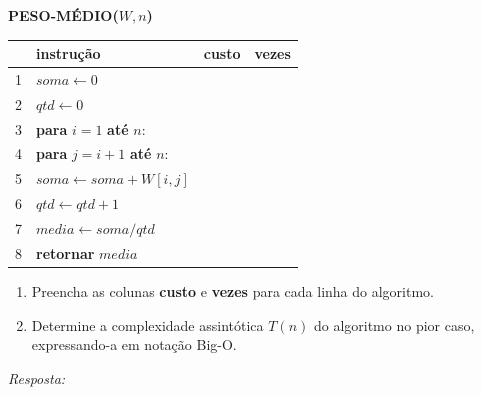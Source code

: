 \documentclass[12pt,a4paper]{article}
\newcommand{\quadro}[1]{\vspace{0.2cm}\begin{tcolorbox}[colback=white, colframe=black, height=#1, boxrule=0.5pt, arc=0pt] \textit{Resposta:} \end{tcolorbox}}
\begin{document}
\begin{enumerate}
    \begin{tcolorbox}[colback=white, colframe=black, fontupper=\small]
        \textbf{PESO-MÉDIO($W, n$)} \\
        \begin{tabular}{llcc}
            \hline
            & \textbf{instrução} & \textbf{custo} & \textbf{vezes} \\
            \hline
            1 & $soma \leftarrow 0$ & \underline{\hspace{1cm}} & \underline{\hspace{1cm}} \\
            2 & $qtd \leftarrow 0$ & \underline{\hspace{1cm}} & \underline{\hspace{1cm}} \\
            3 & \textbf{para} $i = 1$ \textbf{até} $n$: & \underline{\hspace{1cm}} & \underline{\hspace{1cm}} \\
            4 & \quad \textbf{para} $j = i+1$ \textbf{até} $n$: & \underline{\hspace{1cm}} & \underline{\hspace{1cm}} \\
            5 & \quad \quad $soma \leftarrow soma + W[i,j]$ & \underline{\hspace{1cm}} & \underline{\hspace{1cm}} \\
            6 & \quad \quad $qtd \leftarrow qtd + 1$ & \underline{\hspace{1cm}} & \underline{\hspace{1cm}} \\
            7 & $media \leftarrow soma / qtd$ & \underline{\hspace{1cm}} & \underline{\hspace{1cm}} \\
            8 & \textbf{retornar} $media$ & \underline{\hspace{1cm}} & \underline{\hspace{1cm}} \\
            \hline
        \end{tabular}
    \end{tcolorbox}

    \begin{enumerate}[label=\alph*)]
        \item Preencha as colunas \textbf{custo} e \textbf{vezes} para cada linha do algoritmo.
        \item Determine a complexidade assintótica $T(n)$ do algoritmo no pior caso, expressando-a em notação Big-O.
    \end{enumerate}
    \quadro{6cm}


\end{enumerate}
\end{document}
